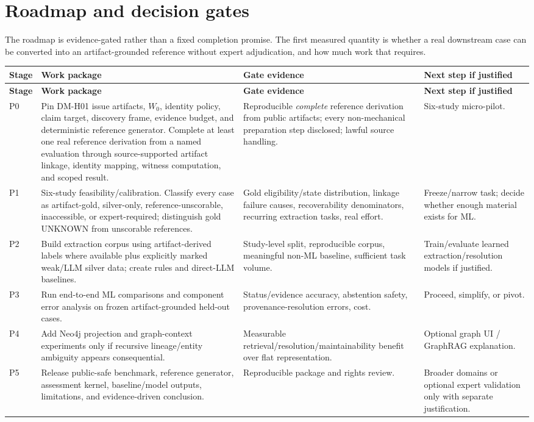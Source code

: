\documentclass[11pt,a4paper]{article}
\newcommand{\status}[1]{\textsf{\small #1}}
\begin{document}
\section{Roadmap and decision gates}
\label{sec:roadmap}
The roadmap is evidence-gated rather than a fixed completion promise. The first measured quantity is whether a real downstream case can be converted into an artifact-grounded reference without expert adjudication, and how much work that requires.

\begin{longtable}{@{}L{15mm}L{50mm}L{47mm}L{38mm}@{}}
\toprule
\textbf{Stage} & \textbf{Work package} & \textbf{Gate evidence} & \textbf{Next step if justified}\\ \midrule
\endfirsthead
\toprule\textbf{Stage} & \textbf{Work package} & \textbf{Gate evidence} & \textbf{Next step if justified}\\ \midrule\endhead
P0 & Pin DM-H01 issue artifacts, $W_0$, identity policy, claim target, discovery frame, evidence budget, and deterministic reference generator. Complete at least one real reference derivation from a named evaluation through source-supported artifact linkage, identity mapping, witness computation, and scoped result. & Reproducible \emph{complete} reference derivation from public artifacts; every non-mechanical preparation step disclosed; lawful source handling. & Six-study micro-pilot.\\
P1 & Six-study feasibility/calibration. Classify every case as artifact-gold, silver-only, reference-unscorable, inaccessible, or expert-required; distinguish gold \status{UNKNOWN} from unscorable references. & Gold eligibility/state distribution, linkage failure causes, recoverability denominators, recurring extraction tasks, real effort. & Freeze/narrow task; decide whether enough material exists for ML.\\
P2 & Build extraction corpus using artifact-derived labels where available plus explicitly marked weak/LLM silver data; create rules and direct-LLM baselines. & Study-level split, reproducible corpus, meaningful non-ML baseline, sufficient task volume. & Train/evaluate learned extraction/resolution models if justified.\\
P3 & Run end-to-end ML comparisons and component error analysis on frozen artifact-grounded held-out cases. & Status/evidence accuracy, abstention safety, provenance-resolution errors, cost. & Proceed, simplify, or pivot.\\
P4 & Add Neo4j projection and graph-context experiments only if recursive lineage/entity ambiguity appears consequential. & Measurable retrieval/resolution/maintainability benefit over flat representation. & Optional graph UI / GraphRAG explanation.\\
P5 & Release public-safe benchmark, reference generator, assessment kernel, baseline/model outputs, limitations, and evidence-driven conclusion. & Reproducible package and rights review. & Broader domains or optional expert validation only with separate justification.\\
\bottomrule
\end{longtable}
\end{document}
